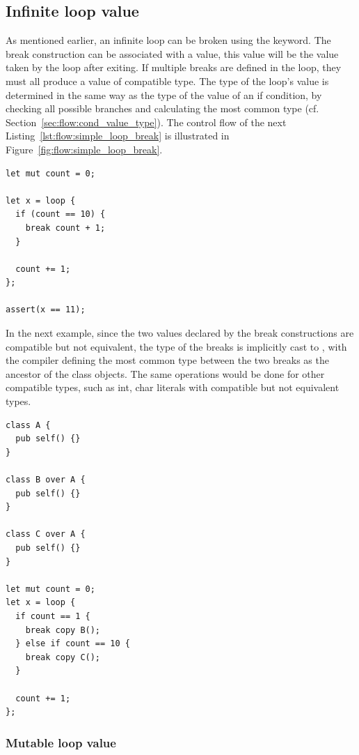 \subsection{Infinite loop value}

As mentioned earlier, an infinite loop can be broken using the 
keyword. The break construction can be associated with a value, this value will
be the value taken by the loop after exiting. If multiple breaks are defined in
the loop, they must all produce a value of compatible type. The type of the
loop's value is determined in the same way as the type of the value of an if
condition, by checking all possible branches and calculating the most common
type (cf. Section~\ref{sec:flow:cond_value_type}). The control flow of the next
Listing~\ref{lst:flow:simple_loop_break} is illustrated in
Figure~\ref{fig:flow:simple_loop_break}.

\begin{lstlisting}[style=coloredverbatim, label=lst:flow:simple_loop_break, caption=Breaking a loop with a value]
let mut count = 0;

let x = loop {
  if (count == 10) {
    break count + 1;
  }

  count += 1;
};

assert(x == 11);
\end{lstlisting}




In the next example, since the two values declared by the break
constructions are compatible but not equivalent, the type of the breaks is
implicitly cast to , with the compiler defining the most common type
between the two breaks as the ancestor of the class objects. The same operations
would be done for other compatible types, such as int, char literals with
compatible but not equivalent types.

\begin{lstlisting}[style=coloredverbatim, escapechar=@]
class A {
  pub self() {}
}

class B over A {
  pub self() {}
}

class C over A {
  pub self() {}
}

let mut count = 0;
let x = loop {
  if count == 1 {
    break copy B();
  } else if count == 10 {
    break copy C();
  }

  count += 1;
};
\end{lstlisting}


\subsubsection{Mutable loop value}

